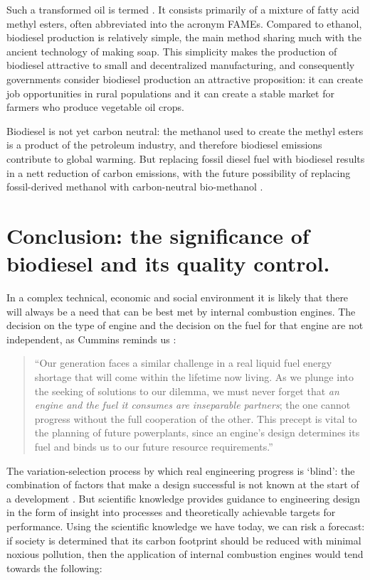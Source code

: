 Such a transformed oil is termed . It consists primarily of a
mixture of fatty acid methyl esters, often abbreviated into the acronym FAMEs.
Compared to ethanol, biodiesel production is relatively simple, the main method
sharing much with the ancient technology of making soap. This simplicity makes
the production of biodiesel attractive to small and decentralized manufacturing,
and consequently governments consider biodiesel production an attractive
proposition: it can create job opportunities in rural populations and it can
create a stable market for farmers who produce vegetable oil crops.

Biodiesel is not yet carbon neutral: the methanol used to create the methyl
esters is a product of the petroleum industry, and therefore biodiesel emissions
contribute to global warming. But replacing fossil diesel fuel with biodiesel
results in a nett reduction of carbon emissions, with the future possibility of
replacing fossil-derived methanol with carbon-neutral bio-methanol
\autocite{Shamsul2014}.

\section[The significance of biodiesel ]{Conclusion: the significance of
biodiesel and its quality control.}

In a complex technical, economic and social environment it is likely that there
will always be a need that can be best met by internal combustion engines. The
decision on the type of engine and the decision on the fuel for that engine are
not independent, as Cummins reminds us \autocite{Cummins1989}:

\begin{quotation}
``Our generation faces a similar challenge in a real liquid fuel energy shortage
that will come within the lifetime now living. As we plunge into the seeking of
solutions to our dilemma, we must never forget that \textit{an engine and the
fuel it consumes are inseparable partners}; the one cannot progress without the
full cooperation of the other. This precept is vital to the planning of future
powerplants, since an engine's design determines its fuel and binds us to our
future resource requirements.''
\end{quotation}

The variation-selection process by which real engineering progress is `blind':
the combination of factors that make a design successful is not known at the
start of a development \autocite{Vincenti1990}. But scientific knowledge
provides guidance to engineering design in the form of insight into processes
and theoretically achievable targets for performance. Using the scientific
knowledge we have today, we can risk a forecast: if society is determined that
its carbon footprint should be reduced with minimal noxious pollution, then the
application of internal combustion engines would tend towards the following:

